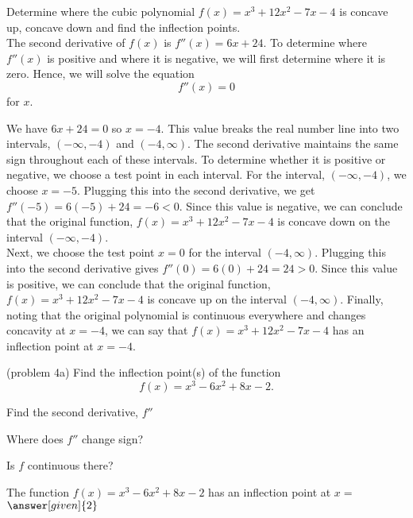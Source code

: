 \documentclass{ximera}
\begin{document}
 
 

\begin{example}[example 4]
Determine where the cubic polynomial $f(x) = x^3 + 12x^2 - 7x - 4$ is concave up, concave down and find the inflection points.\\
The second derivative of $f(x)$ is 
$f''(x) = 6x + 24$.  To determine where $f''(x)$ is positive and where it is negative, 
we will first determine where it is zero. Hence, we will solve the equation
\[f''(x) = 0\]
for $x$.

We have $6x + 24 = 0$ so $x = -4$.
This value breaks the real number line into two intervals, $(-\infty, -4)$ and $(-4, \infty)$.
The second derivative maintains the same sign throughout each of these intervals.  
To determine whether it is positive or negative, we choose a test point in each interval.
For the interval, $(-\infty, -4)$, we choose $x = -5$.  Plugging this into the second derivative, we get
$f''(-5) = 6(-5) + 24 = -6 < 0$.  Since this value is negative, we can conclude that the original function,
$f(x) = x^3 + 12x^2 - 7x - 4$ is concave down on the interval $(-\infty, -4)$. \\

Next, we choose the test point 
$x = 0$ for the interval $(-4, \infty)$.  Plugging this into the second derivative gives $f''(0) = 6(0) + 24 = 24 > 0$.
Since this value is positive, we can conclude that the original function,
$f(x) = x^3 + 12x^2 - 7x - 4$ is concave up on the interval $(-4, \infty)$.
Finally, noting that the original polynomial is continuous everywhere and changes concavity at $x = -4$, we can say that
$f(x) = x^3 + 12x^2 - 7x - 4$ has an inflection point at $x = -4$.
\end{example}


\begin{problem}(problem 4a)
  Find the inflection point(s) of the function
  \[
     f(x) = x^3 - 6x^2 + 8x - 2.
  \]
 
    \begin{hint}
      Find the second derivative, $f''$
    \end{hint}
    \begin{hint}
      Where does $f''$ change sign?
    \end{hint}
    \begin{hint}
      Is $f$ continuous there?
    \end{hint}    
		The function $f(x) = x^3 - 6x^2 + 8x - 2$ has an inflection point at $x =$
		 $\answer[given]{2}$
	
\end{problem}
\end{document}

